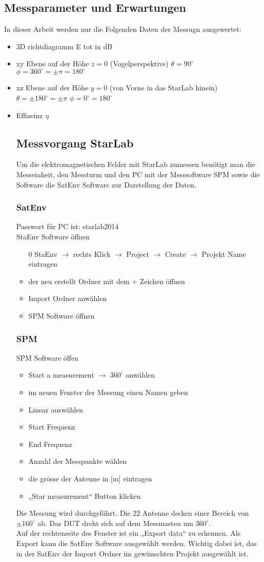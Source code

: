 \subsection{Messparameter und Erwartungen}
In dieser Arbeit werden nur die Folgenden Daten der Messugn ausgewertet:
\begin{itemize}
	\item 3D richtdiagramm E tot in dB
	\item xy Ebene auf der Höhe $z=0$ (Vogelperspektive) $\theta=90^\circ$ $\phi=360^\circ= \pm \pi=180^\circ$
	\item xz Ebene auf der Höhe $y=0$ (von Vorne in das StarLab hinein) $\theta=\pm 180^\circ =\pm \pi$ $\phi= 0^\circ = 180^\circ$
	\item Effizeinz $\eta$
	\subsection{Messvorgang StarLab}
	Um die elektromagnetischen Felder mit StarLab zumessen benötigt man  die Messeinheit, den Messturm und den PC mit der Messsoftware SPM sowie die Software die SatEnv Software  zur Darstellung der Daten.
	\subsubsection{SatEnv}
	Passwort für PC ist: starlab2014\\
	StaEnv Software öffnen
	\begin{itemize}
	\item [0]StaEnv $\rightarrow$ rechts Klick $\rightarrow$ Project $\rightarrow$ Create $\rightarrow$ Projekt Name eintragen
	\item der neu erstellt Ordner mit dem $+$ Zeichen öffnen
	\item Import Ordner anwählen
	\item SPM Software öffnen
	\end{itemize}
	\subsubsection{SPM}
	SPM Software öffen
	\begin{itemize}
	\item Start a measurement $\rightarrow$ $360^\circ$ anwählen 
	\item im neuen Fenster der Messung einen Namen geben
	\item Linear auswählen
	\item Start Frequenz
	\item End Frequenz 
	\item Anzahl der Messpunkte wählen
	\item die grösse der Antenne in [m] eintragen
	\item „Star measurement“ Button klicken
	\end{itemize}
	Die Messung wird durchgeführt. Die 22 Antenne decken einer Bereich von $\pm 160^\circ$ ab. Das DUT dreht sich auf dem Messmasten um $360^\circ$.\\
	Auf der rechtenseite des Fenster ist ein „Export data“ zu erkennen. Als Export kann die SatEnv Software ausgewählt werden. Wichtig dabei ist, das in der SatEnv der Import Ordner im gewünschten Projekt ausgewählt ist.
	

\end{itemize}

